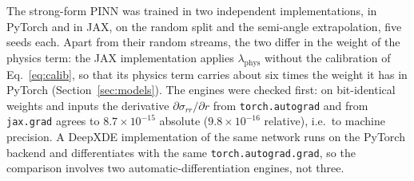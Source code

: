 The strong-form PINN was trained in two independent implementations, in PyTorch and in JAX, on the random split and the semi-angle extrapolation, five seeds each. Apart from their random streams, the two differ in the weight of the physics term: the JAX implementation applies $\lambda_{\mathrm{phys}}$ without the calibration of Eq.~\eqref{eq:calib}, so that its physics term carries about six times the weight it has in PyTorch (Section~\ref{sec:models}). The engines were checked first: on bit-identical weights and inputs the derivative $\partial\sigma_{rr}/\partial r$ from \texttt{torch.autograd} and from \texttt{jax.grad} agrees to $8.7\times10^{-15}$ absolute ($9.8\times10^{-16}$ relative), i.e.\ to machine precision. A DeepXDE implementation \citep{lu2021} of the same network runs on the PyTorch backend and differentiates with the same \texttt{torch.autograd.grad}, so the comparison involves two automatic-differentiation engines, not three.

